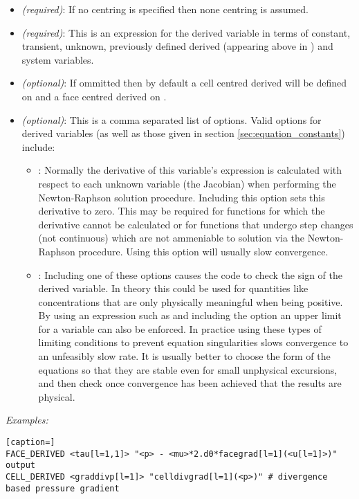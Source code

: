 \begin{itemize}
\item {} \emph{(required)}:  If no centring is specified then none centring is assumed.
\item {} \emph{(required)}:  This is an expression for the derived variable in terms of constant, transient, unknown, previously defined derived (appearing above in ) and system variables.
\item {} \emph{(optional)}:  If ommitted then by default a cell centred derived will be defined on  and a face centred derived on .
\item {} \emph{(optional)}:  This is a comma separated list of options.  Valid options for derived variables (as well as those given in section \ref{sec:equation_constants}) include:
\begin{itemize}
\item {}:  Normally the derivative of this variable's expression is calculated with respect to each unknown variable (the Jacobian) when performing the Newton-Raphson solution procedure.  Including this option sets this derivative to zero.  This may be required for functions for which the derivative cannot be calculated or for functions that undergo step changes (not continuous) which are not ammeniable to solution via the Newton-Raphson procedure.  Using this option will usually slow convergence.
\item {}:  Including one of these options causes the code to check the sign of the derived variable.  In theory this could be used for quantities like concentrations that are only physically meaningful when being positive.  By using an expression such as  and including the option  an upper limit for a variable can also be enforced.  In practice using these types of limiting conditions to prevent equation singularities slows convergence to an unfeasibly slow rate.  It is usually better to choose the form of the equations so that they are stable even for small unphysical excursions, and then check once convergence has been achieved that the results are physical.
\end{itemize}
\end{itemize}

\emph{Examples:}

\begin{lstlisting}[caption=]
FACE_DERIVED <tau[l=1,1]> "<p> - <mu>*2.d0*facegrad[l=1](<u[l=1]>)" output
CELL_DERIVED <graddivp[l=1]> "celldivgrad[l=1](<p>)" # divergence based pressure gradient
\end{lstlisting}


